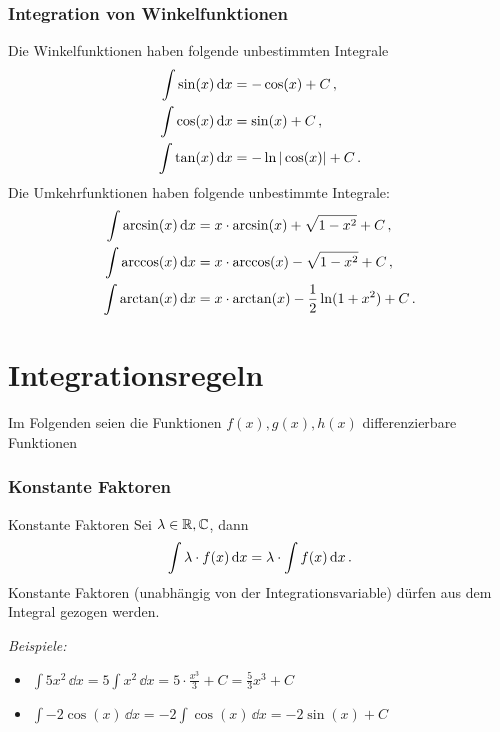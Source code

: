\subsubsection{Integration von Winkelfunktionen}
Die Winkelfunktionen haben folgende unbestimmten Integrale
\begin{align*}
    \int \sin(x) \,\mathrm{d} x &= -\cos(x) + C\,{,}\, \\
    \int \cos(x) \,\mathrm{d} x &= \sin(x) + C\,{,}\, \\
    \int \tan(x) \,\mathrm{d} x &= -\ln|\cos(x)| + C \,.
\end{align*}
Die Umkehrfunktionen haben folgende unbestimmte Integrale:
\begin{align*}
    \int \arcsin(x) \,\mathrm{d} x &= x \cdot \arcsin(x) + \sqrt{1-x^2} + C\,{,}\, \\
    \int \arccos(x) \,\mathrm{d} x &= x \cdot \arccos(x) - \sqrt{1-x^2} + C\,{,}\, \\
    \int \arctan(x) \,\mathrm{d} x &= x \cdot \arctan(x) - \frac{1}{2} \ln(1+x^2) + C\,.
\end{align*}        



\section{Integrationsregeln}\label{sec: Integrationsregeln}
Im Folgenden seien die Funktionen $f(x), g(x), h(x)$ differenzierbare Funktionen

\subsubsection{Konstante Faktoren}
\begin{rememberbox}[]{Konstante Faktoren}
Sei $\lambda \in \mathbb{R}, \mathbb{C}$, dann
    \begin{equation}
        \int \lambda\cdot f(x)\,\mathrm{d} x = \lambda\cdot\int f(x)\,\mathrm{d} x \,.
    \end{equation}
Konstante Faktoren (unabhängig von der Integrationsvariable) dürfen aus dem Integral gezogen werden.
\end{rememberbox}
\textit{Beispiele:}
\begin{itemize}
    \item $ \int 5x^2 \,\dd x = 5 \int x^2 \,\dd x = 5 \cdot \frac{x^3}{3} + C = \frac{5}{3}x^3 + C $
    \item $ \int -2\cos(x) \,\dd x = -2 \int \cos(x) \,\dd x = -2\sin(x) + C $
\end{itemize}



